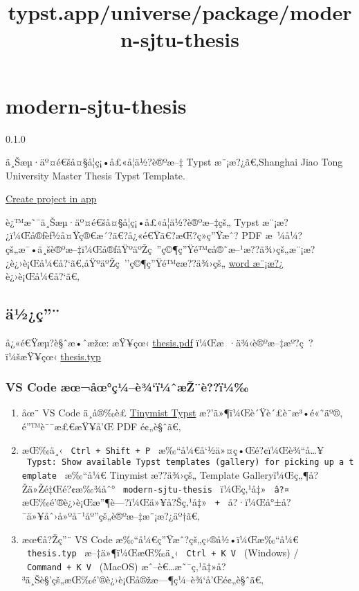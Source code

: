 \title{typst.app/universe/package/modern-sjtu-thesis}

\label{banner}
\label{template-thumbnail}

\section{modern-sjtu-thesis}\label{modern-sjtu-thesis}

{ 0.1.0 }

ä¸Šæµ·äº¤é€šå¤§å­¦ç¡•å£«å­¦ä½?è®ºæ--‡ Typst æ¨¡æ?¿ã€‚Shanghai Jiao Tong
University Master Thesis Typst Template.

\href{/app?template=modern-sjtu-thesis&version=0.1.0}{Create project in
app}

\label{readme}
è¿™æ˜¯ä¸Šæµ·äº¤é€šå¤§å­¦ç¡•å£«å­¦ä½?è®ºæ--‡çš„ Typst
æ¨¡æ?¿ï¼Œå®ƒèƒ½å¤Ÿç®€æ´?ã€?å¿«é€Ÿã€?æŒ?ç»­ç''Ÿæˆ? PDF
æ~¼å¼?çš„æ¯•ä¸šè®ºæ--‡ï¼Œå®ƒåŸºäºŽç~''ç©¶ç''Ÿé™¢å®˜æ--¹æ??ä¾›çš„æ¨¡æ?¿è¿›è¡Œå¼€å?{}`ã€‚åŸºäºŽç~''ç©¶ç''Ÿé™¢æ??ä¾›çš„
\href{https://www.gs.sjtu.edu.cn/post/detail/Z3M2MjU=}{word æ¨¡æ?¿}
è¿›è¡Œå¼€å?{}`ã€‚

\subsection{ä½¿ç''¨}\label{uxe4uxbduxe7}

å¿«é€Ÿæµ?è§ˆæ•ˆæžœ: æŸ¥çœ‹
\href{https://github.com/tzhTaylor/typst-sjtu-thesis-master/releases/download/v0.1.0/thesis.pdf}{thesis.pdf}
ï¼Œæ~·ä¾‹è®ºæ--‡æº?ç~?ï¼šæŸ¥çœ‹
\href{https://github.com/tzhTaylor/typst-sjtu-thesis-master/blob/main/template/thesis.typ}{thesis.typ}

\subsubsection{VS Code
æœ¬åœ°ç¼--è¾`ï¼ˆæŽ¨è??ï¼‰}\label{vs-code-uxe6ux153uxe5ux153uxe7uxbcuxe8uxbeuxefuxbcux2c6uxe6ux17euxe8uxefuxbc}

\begin{enumerate}
\item
  åœ¨ VS Code ä¸­å®‰è£
  \href{https://marketplace.visualstudio.com/items?itemName=myriad-dreamin.tinymist}{Tinymist
  Typst} æ?'ä»¶ï¼Œè´Ÿè´£è¯­æ³•é«˜äº®, é''™è¯¯æ£€æŸ¥å'Œ PDF é¢„è§ˆã€‚
\item
  æŒ‰ä¸‹ \texttt{\ Ctrl\ +\ Shift\ +\ P\ }
  æ‰``å¼€å`½ä»¤ç•Œé?¢ï¼Œè¾``å\ldots¥
  \texttt{\ Typst:\ Show\ available\ Typst\ templates\ (gallery)\ for\ picking\ up\ a\ template\ }
  æ‰``å¼€ Tinymist æ??ä¾›çš„ Template Galleryï¼Œç„¶å?Žä»Žé‡Œé?¢æ‰¾åˆ°
  \texttt{\ modern-sjtu-thesis\ } ï¼Œç‚¹å‡» \texttt{\ â?¤\ }
  æŒ‰é'®è¿›è¡Œæ''¶è---?ï¼Œä»¥å?Šç‚¹å‡» \texttt{\ +\ }
  å?·ï¼Œå°±å?¯ä»¥åˆ›å»ºå¯¹åº''çš„è®ºæ--‡æ¨¡æ?¿äº†ã€‚
\item
  æœ€å?Žç''¨ VS Code æ‰``å¼€ç''Ÿæˆ?çš„ç›®å½•ï¼Œæ‰``å¼€
  \texttt{\ thesis.typ\ } æ--‡ä»¶ï¼ŒæŒ‰ä¸‹ \texttt{\ Ctrl\ +\ K\ V\ }
  (Windows) / \texttt{\ Command\ +\ K\ V\ } (MacOS)
  æˆ--è€\ldots æ˜¯ç‚¹å‡»å?³ä¸Šè§'çš„æŒ‰é'®è¿›è¡Œå®žæ---¶ç¼--è¾`å'Œé¢„è§ˆã€‚
\end{enumerate}

